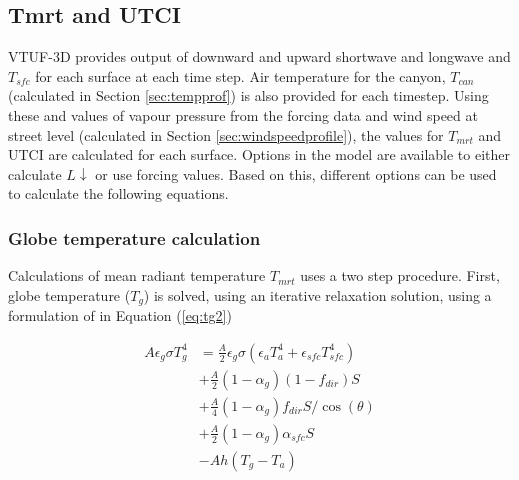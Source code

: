 \documentclass[preprint,12pt,authoryear]{elsarticle}
\begin{document}




\subsection{Tmrt and UTCI}\label{sec:tmrtutci}

VTUF-3D provides output of downward and upward shortwave and longwave and $T_{sfc}$ for each surface at each time step. Air temperature for the canyon, $T_{can}$ (calculated in Section \ref{sec:tempprof}) is also provided for each timestep. Using these and values of vapour pressure from the forcing data and wind speed at street level (calculated in Section \ref{sec:windspeedprofile}), the values for $T_{mrt}$ and UTCI are calculated for each surface. Options in the model are available to either calculate $L\downarrow$ or use forcing values. Based on this, different options can be used to calculate the following equations.

\subsubsection{Globe temperature calculation}

Calculations of mean radiant temperature $T_{mrt}$ uses a two step procedure. First, globe temperature ($T_{g}$) is solved, using an iterative relaxation solution, using a formulation of \cite{Liljegren2008} in Equation (\ref{eq:tg2}) 


\begin{equation}\label{eq:tg2}
\begin{split}
A\epsilon_{g}\sigma T_{g}^{4} &= \frac{A}{2} \epsilon_{g}\sigma( \epsilon_{a} T_{a}^{4} +  \epsilon_{sfc} T_{sfc}^{4} ) \\
&+ \frac{A}{2}( 1-\alpha_{g})(1-f_{dir})S  \\
&+ \frac{A}{4}( 1-\alpha_{g})f_{dir}S /\cos(\theta) \\
&+ \frac{A}{2}( 1-\alpha_{g})\alpha_{sfc}S \\
&- Ah(T_{g}-T_{a})   
\end{split}
\end{equation}
\end{document}
